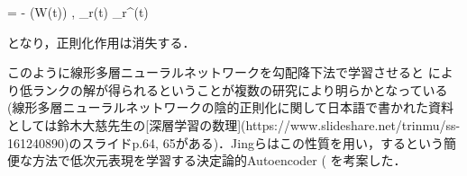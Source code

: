  = - \left\langle \nabla {}(W(t)) , _r(t) _r^\top(t) \right\rangle


となり，正則化作用は消失する．

このように線形多層ニューラルネットワークを勾配降下法で学習させると\textbf{} により低ランクの解が得られるということが複数の研究により明らかとなっている (線形多層ニューラルネットワークの陰的正則化に関して日本語で書かれた資料としては鈴木大慈先生の[深層学習の数理](https://www.slideshare.net/trinmu/ss-161240890)のスライドp.64, 65がある)．Jingらはこの性質を用い，\textbf{}するという簡便な方法で低次元表現を学習する決定論的Autoencoder (\textbf{} を考案した．
